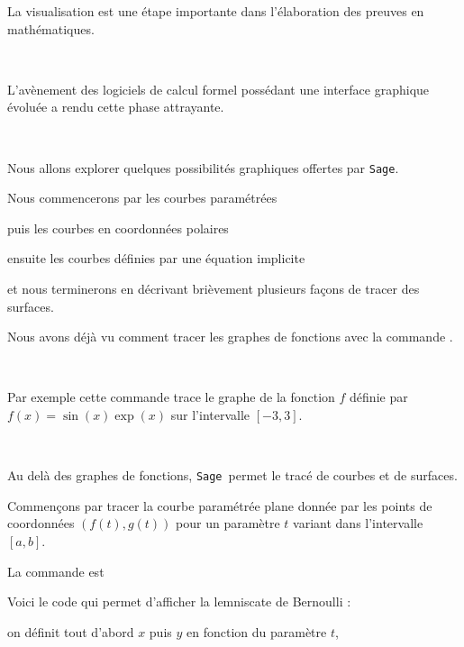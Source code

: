 

\newcommand{\Sage}{\texttt{Sage}}




\debuttexte


\diapo

La visualisation est une étape importante dans l'élaboration 
des preuves en mathématiques. 

~


L'avènement des logiciels de calcul 
formel possédant une interface graphique évoluée a 
rendu cette phase attrayante. 

~

Nous allons explorer 
quelques possibilités graphiques offertes par \Sage.

\change

\change
Nous commencerons par les courbes paramétrées

\change
puis les courbes en coordonnées polaires

\change
ensuite les courbes définies par une équation implicite

\change
et nous terminerons en décrivant brièvement plusieurs façons de tracer des surfaces.



\diapo


Nous avons déjà vu comment tracer les graphes de fonctions avec la commande .

~

Par exemple cette commande 
trace le graphe de la fonction $f$ définie par $f(x)=\sin(x)\exp(x)$ sur l'intervalle $[-3,3]$.

~

Au delà des graphes de fonctions, \Sage\ permet le tracé de courbes et de surfaces.%

\change

Commençons par tracer la courbe paramétrée plane donnée par les points 
de coordonnées $(f(t), g(t))$ pour un paramètre $t$ variant 
dans l'intervalle $[a,b]$. 

\change
La commande est  

\change
Voici le code qui permet d'afficher la lemniscate de Bernoulli :

on définit tout d'abord $x$ puis $y$ en fonction du paramètre $t$, 

